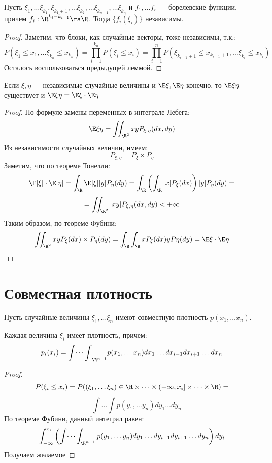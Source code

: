 \begin{proposition}
    Пусть \(\xi_1, \dots \xi_{k_1}, \xi_{k_1 + 1}, \dots \xi_{k_2}, \dots \xi_{k_{n - 1}}, \dots \xi_{k_n}\) и \(f_1, \dots f_r\) --- борелевские функции, причем \(f_i: \R^{k_i - k_{i - 1}} \ra \R\). Тогда \(\{f_i(\xi_i)\}\) независимы.
\end{proposition}
\begin{proof}
    Заметим, что блоки, как случайные векторы, тоже независимы, т.к.:
    \[P(\xi_1 \le x_1, \dots \xi_{k_n} \le x_{k_n}) = \prod_{i = 1}^{k_n}P(\xi_i \le x_i) = \prod_{i = 1}^n P(\xi_{k_{i - 1} + 1} \le x_{k_{i - 1} + 1}, \dots \xi_{k_i} \le x_{k_i})\]
    Осталось воспользоваться предыдущей леммой.
\end{proof}

\begin{theorem}
    Если \(\xi, \eta\) --- независимые случайные величины и \(\E\xi, \E\eta\) конечно, то \(\E\xi\eta\) существует и \(\E\xi\eta = \E\xi \cdot \E\eta\)
\end{theorem}
\begin{proof}
    По формуле замены переменных в интеграле Лебега:
    \[\E\xi\eta = \iint_{\R^2}xy P_{\xi, \eta}(dx, dy)\]
    Из независимости случайных величин, имеем:
    \[P_{\xi, \eta} = P_\xi \times P_\eta\]
    Заметим, что по теореме Тонелли:
    \[\E|\xi|\cdot \E|\eta| = \int_\R \E|\xi||y|P_\eta(dy) = \int_\R\left( \int_\R|x|P_\xi(dx) \right)|y|P_\eta(dy) = \]
    \[= \iint_{\R^2} |xy| P_{\xi, \eta}(dx, dy) < +\infty\]
    Таким образом, по теореме Фубини:
    \[\iint_{\R^2} xy  P_\xi(dx) \times P_\eta(dy) = \int_\R \int_\R x P_\xi(dx) y P\eta(dy) = \E\xi \cdot \E\eta\]
\end{proof}

\section{Совместная плотность}
Пусть случайные величины \(\xi_1, \dots \xi_n\) имеют совместную плотность \(p(x_1, \dots x_n)\).

\begin{proposition}
    Каждая величина \(\xi_i\) имеет плотность, причем:
    \[p_i(x_i) = {\int\dots \int}_{\R^{n - 1}}p(x_1, \dots x_n)dx_1\dots dx_{i-1}dx_{i+1}\dots dx_n\]
\end{proposition}
\begin{proof}
    \[P(\xi_i \le x_i) = P((\xi_1, \dots \xi_n) \in \R \times \dots \times (-\infty, x_i] \times \dots \times \R) = \]
    \[= \int\dots\int p(y_1, \dots y_n)dy_1\dots dy_n\]
    По теореме Фубини, данный интеграл равен:
    \[\int_{-\infty}^{x_i}\left( \int\dots\int_{\R^{n - 1}}p(y_1, \dots y_n)dy_1\dots dy_{i-1}dy_{i+1}\dots dy_n \right)dy_i\]
    Получаем желаемое
\end{proof}

